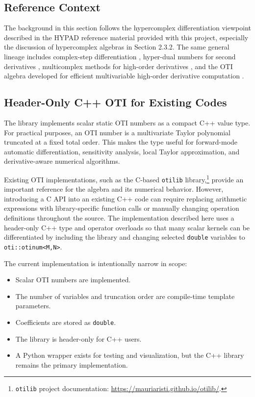 \documentclass[11pt]{article}
\begin{document}
\subsection{Reference Context}

The background in this section follows the hypercomplex differentiation
viewpoint described in the HYPAD reference material provided with this
project, especially the discussion of hypercomplex algebras in Section 2.3.2.
The same general lineage includes complex-step differentiation
\cite{Martins2003}, hyper-dual numbers for second derivatives
\cite{Fike2011}, multicomplex methods for high-order derivatives
\cite{Lantoine2012}, and the OTI algebra developed for efficient
multivariable high-order derivative computation \cite{Cano2020}.

\subsection{Header-Only C++ OTI for Existing Codes}

The library implements scalar static OTI numbers as a compact C++ value type.
For practical purposes, an OTI number is a multivariate Taylor polynomial
truncated at a fixed total order. This makes the type useful for forward-mode
automatic differentiation, sensitivity analysis, local Taylor approximation,
and derivative-aware numerical algorithms.

Existing OTI implementations, such as the C-based \texttt{otilib}
library,\footnote{\texttt{otilib} project documentation:
\url{https://mauriaristi.github.io/otilib/}.} provide an important reference
for the algebra and its numerical behavior. However, introducing a C API into
an existing C++ code can require replacing arithmetic expressions with
library-specific function calls or manually changing operation definitions
throughout the source. The implementation described here uses a header-only C++
type and operator overloads so that many scalar kernels can be differentiated
by including the library and changing selected \texttt{double} variables to
\texttt{oti::otinum<M,N>}.

The current implementation is intentionally narrow in scope:

\begin{itemize}[noitemsep]
    \item Scalar OTI numbers are implemented.
    \item The number of variables and truncation order are compile-time
    template parameters.
    \item Coefficients are stored as \texttt{double}.
    \item The library is header-only for C++ users.
    \item A Python wrapper exists for testing and visualization, but the C++
    library remains the primary implementation.
\end{itemize}
\end{document}

